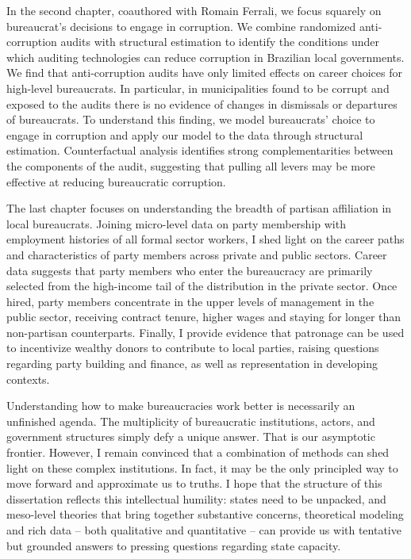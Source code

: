 In the second chapter, coauthored with Romain Ferrali, we focus squarely on bureaucrat's decisions to engage in corruption. We combine randomized anti-corruption audits with structural estimation to identify the conditions under which auditing technologies can reduce corruption in Brazilian local governments. We find that anti-corruption audits have only limited effects on career choices for high-level bureaucrats. In particular, in municipalities found to be corrupt and exposed to the audits there is no evidence of changes in dismissals or departures of bureaucrats. To understand this finding, we model bureaucrats' choice to engage in corruption and apply our model to the data through structural estimation. Counterfactual analysis identifies strong complementarities between the components of the audit, suggesting that pulling all levers may be more effective at reducing bureaucratic corruption.

The last chapter focuses on understanding the breadth of partisan affiliation in local bureaucrats. Joining micro-level data on party membership with employment histories of all formal sector workers, I shed light on the career paths and characteristics of party members across private and public sectors. Career data suggests that party members who enter the bureaucracy are primarily selected from the high-income tail of the distribution in the private sector. Once hired, party members concentrate in the upper levels of management in the public sector, receiving contract tenure, higher wages and staying for longer than non-partisan counterparts. Finally, I provide evidence that patronage can be used to incentivize wealthy donors to contribute to local parties, raising questions regarding party building and finance, as well as representation in developing contexts.

Understanding how to make bureaucracies work better is necessarily an unfinished agenda. The multiplicity of bureaucratic institutions, actors, and government structures simply defy a unique answer. That is our asymptotic frontier. However, I remain convinced that a combination of methods can shed light on these complex institutions. In fact, it may be the only principled way to move forward and approximate us to truths. I hope that the structure of this dissertation reflects this intellectual humility: states need to be unpacked, and meso-level theories that bring together substantive concerns, theoretical modeling and rich data -- both qualitative and quantitative -- can provide us with tentative but grounded answers to pressing questions regarding state capacity. 

